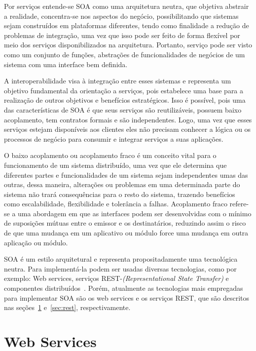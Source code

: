 Por serviços entende-se SOA como uma arquitetura neutra, que objetiva abstrair a realidade, concentra-se nos aspectos do negócio, possibilitando que sistemas sejam construídos em plataformas diferentes, tendo como finalidade a redução de problemas de integração, uma vez que isso  pode ser feito de forma flexível por meio dos serviços disponibilizados na arquitetura. Portanto, serviço pode ser visto como um conjunto de funções, abstrações de funcionalidades de negócios de um sistema com uma interface bem definida.

A interoperabilidade visa à integração entre esses sistemas e representa um objetivo fundamental da orientação a serviços, pois estabelece uma base para a realização de outros objetivos e benefícios estratégicos. Isso é possível, pois uma das características de SOA é que seus serviços são reutilizáveis, possuem baixo acoplamento, tem contratos formais e são independentes. Logo, uma vez que esses serviços estejam disponíveis aos clientes eles não precisam conhecer a lógica ou os processos de negócio para consumir e integrar serviços a suas aplicações.

O baixo acoplamento ou acoplamento fraco é um conceito vital para o funcionamento de um sistema distribuído, uma vez que ele determina que diferentes partes e funcionalidades de um sistema sejam independentes umas das outras, dessa maneira, alterações ou problemas em uma determinada parte do sistema não trará consequências para o resto do sistema, trazendo benefícios como escalabilidade, flexibilidade e tolerância a falhas. Acoplamento fraco refere-se a uma abordagem em que as interfaces podem ser desenvolvidas com o mínimo de suposições mútuas entre o emissor e os destinatários, reduzindo assim o risco de que uma mudança em um aplicativo ou módulo force uma mudança em outra aplicação ou módulo.

SOA é um estilo arquitetural e representa propositadamente uma tecnológica neutra. Para implementá-la podem ser usadas diversas tecnologias, como por exemplo: Web services, serviços REST-\emph{(Representational State Transfer)} e componentes distribuídos~\cite{erl2012soa}. Porém, atualmente as tecnologias mais empregadas para implementar SOA são os web services e os serviços REST, que são descritos nas seções~\ref{sec:webservice} e~\ref{sec:rest}, respectivamente.

\section{Web Services}\label{sec:webservice}

